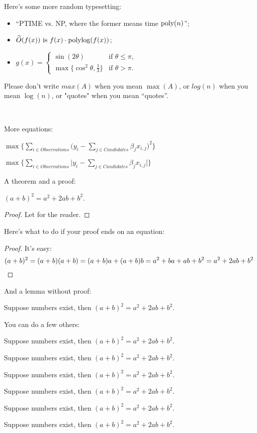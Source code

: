 \documentclass[12pt]{article}
\begin{document}
Here's some more random typesetting: 
\begin{itemize}
\item ``PTIME vs. NP, where the former means time $\mathrm{poly}(n)$'';
\item $\widetilde{O}(f(x)) \text{ is } f(x) \cdot \mathrm{polylog}(f(x))$;
\item $\displaystyle 
        g(x) = \begin{cases}
                   \sin(2\theta) & \text{if $\theta \leq \pi$,}\\
                   \max\{\cos^2\theta, \tfrac13\} & \text{if $\theta > \pi$.}
               \end{cases}
      $
\end{itemize}
Please don't write $max(A)$ when you mean $\max(A)$, or $log(n)$ when you mean $\log(n)$, or "quotes" when you mean ``quotes''.

\

More equations:

$\max \Big\{ \sum_{i \in Observations} \Big( y_i - \sum_{j \in Candidates} \beta_j x_{i,j} \Big) ^2 \Big\}$

$\max\Bigg\{ \sum_{i \in Observations} \Big| y_i - \sum_{j \in Candidates} \beta_j x_{i,j} \Big| \Bigg\}$

A theorem and a proof:
\begin{theorem} $(a+b)^2 = a^2 + 2ab + b^2$.
\end{theorem}
\begin{proof}
Let for the reader.
\end{proof}

\bigskip

Here's what to do if your proof ends on an equation:
\begin{proof}
It's easy:
\[
    (a+b)^2 = (a+b)(a+b) = (a+b)a + (a+b)b = a^2 + ba + ab + b^2 = a^2 + 2ab + b^2 \qedhere
\]
\end{proof}

And a lemma without proof:
\begin{lemma}
Suppose numbers exist, then $(a+b)^2 = a^2 + 2ab + b^2$.
\end{lemma}

You can do a few others:
\begin{example}
Suppose numbers exist, then $(a+b)^2 = a^2 + 2ab + b^2$.
\end{example}
\begin{conjecture}
Suppose numbers exist, then $(a+b)^2 = a^2 + 2ab + b^2$.
\end{conjecture}
\begin{definition}
Suppose numbers exist, then $(a+b)^2 = a^2 + 2ab + b^2$.
\end{definition}
\begin{observation}
Suppose numbers exist, then $(a+b)^2 = a^2 + 2ab + b^2$.
\end{observation}
\begin{remark}
Suppose numbers exist, then $(a+b)^2 = a^2 + 2ab + b^2$.
\end{remark}
\begin{claim}
Suppose numbers exist, then $(a+b)^2 = a^2 + 2ab + b^2$.
\end{claim}
\end{document}
